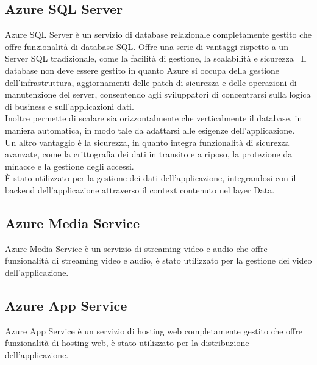 \subsection{Azure SQL Server}
Azure SQL Server è un servizio di database relazionale completamente gestito che offre funzionalità di database SQL.
Offre una serie di vantaggi rispetto a un Server SQL tradizionale, come la facilità di gestione, la scalabilità e sicurezza \
Il database non deve essere gestito in quanto Azure si occupa della gestione dell'infrastruttura, aggiornamenti delle patch di sicurezza e delle operazioni di manutenzione del server, consentendo agli sviluppatori di concentrarsi sulla logica di business e sull'applicazioni dati.\\
Inoltre permette di scalare sia orizzontalmente che verticalmente il database, in maniera automatica, in modo tale da adattarsi alle esigenze dell'applicazione.\\
Un altro vantaggio è la sicurezza, in quanto integra funzionalità di sicurezza avanzate, come la crittografia dei dati in transito e a riposo, la protezione da minacce e la gestione degli accessi.\\
È stato utilizzato per la gestione dei dati dell'applicazione, integrandosi con il backend dell'applicazione attraverso il context contenuto nel layer Data.\\

\subsection{Azure Media Service}
Azure Media Service è un servizio di streaming video e audio che offre funzionalità di streaming video e audio, è stato utilizzato per la gestione dei video dell'applicazione.\\


\subsection{Azure App Service}
Azure App Service è un servizio di hosting web completamente gestito che offre funzionalità di hosting web, è stato utilizzato per la distribuzione dell'applicazione.\\
